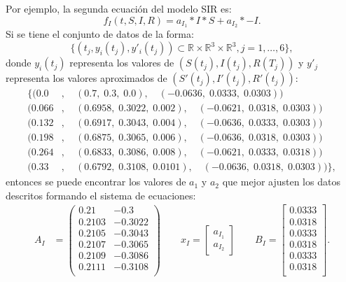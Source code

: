 Por ejemplo, la segunda ecuación del modelo SIR es:
$$f_I (t,S,I,R) = a_{I_1} * I * S + a_{I_2} * -I.$$
Si se tiene el conjunto de datos de la forma:
$$\{(t_j, y_i(t_j), y'_i(t_j)) \subset \mathbb{R} \times \mathbb{R}^{3} \times \mathbb{R}^3, j = 1, \dots, 6\},$$
donde $y_i(t_j)$ representa los valores de $(S(t_j), I(t_j), R(T_j))$ y $y'_j$ representa los valores aproximados de $(S'(t_j), I'(t_j), R'(t_j))$:
\begin{align*}
    \{  (0.0 & , \quad (0.7, \; 0.3, \; 0.0), \quad (-0.0636, \; 0.0333, \; 0.0303))              \\
    (0.066   & , \quad (0.6958, \; 0.3022, \; 0.002), \quad (-0.0621, \; 0.0318, \; 0.0303))      \\
    (0.132   & , \quad (0.6917, \; 0.3043, \; 0.004), \quad (-0.0636, \; 0.0333, \; 0.0303))      \\
    (0.198   & , \quad (0.6875, \; 0.3065, \; 0.006), \quad (-0.0636, \; 0.0318, \; 0.0303))      \\
    (0.264   & , \quad (0.6833, \; 0.3086, \; 0.008), \quad (-0.0621, \; 0.0333, \; 0.0318))      \\
    (0.33    & , \quad (0.6792, \; 0.3108, \; 0.0101), \quad (-0.0636, \; 0.0318, \; 0.0303)) \},
\end{align*}
entonces se puede encontrar los valores de $a_1$ y $a_2$ que mejor ajusten los datos descritos formando el sistema de ecuaciones:
\begin{align*}
    A_I & = \begin{pmatrix}
        0.21   & -0.3    \\
        0.2103 & -0.3022 \\
        0.2105 & -0.3043 \\
        0.2107 & -0.3065 \\
        0.2109 & -0.3086 \\
        0.2111 & -0.3108 \\
    \end{pmatrix}
    \qquad
    x_I = \begin{bmatrix}
        a_{I_1} \\
        a_{I_2}
    \end{bmatrix}
    \qquad
    B_I = \begin{bmatrix}
        0.0333 \\
        0.0318 \\
        0.0333 \\
        0.0318 \\
        0.0333 \\
        0.0318 \\
    \end{bmatrix}.
\end{align*}

